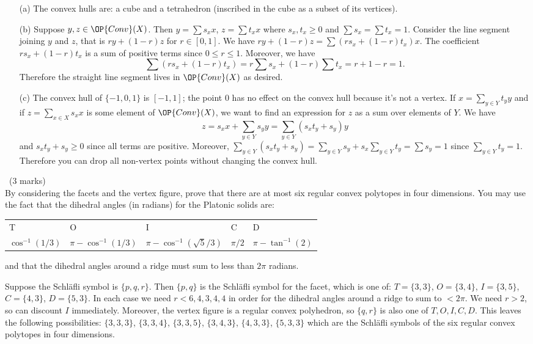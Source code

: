 \documentclass[12pt]{article}
\begin{document}
\begin{answer}
  \begin{enumerate}
  \item[(a)] The convex hulls are: a cube and a tetrahedron (inscribed in the cube as a subset of its vertices).
  \item[(b)] Suppose $y,z\in\OP{Conv}(X)$. Then $y=\sum s_xx$, $z=\sum t_xx$ where $s_x,t_x\geq 0$ and $\sum s_x=\sum t_x=1$. Consider the line segment joining $y$ and $z$, that is $ry+(1-r)z$ for $r\in[0,1]$. We have $ry+(1-r)z=\sum(rs_x+(1-r)t_x)x$. The coefficient $rs_x+(1-r)t_x$ is a sum of positive terms since $0\leq r\leq 1$. Moreover, we have
    \[\sum (rs_x+(1-r)t_x)=r\sum s_x+(1-r)\sum t_x=r+1-r=1.\]
    Therefore the straight line segment lives in $\OP{Conv}(X)$ as desired.
  \item[(c)] The convex hull of $\{-1,0,1\}$ is $[-1,1]$; the point 0 has no effect on the convex hull because it's not a vertex. If $x=\sum_{y\in Y} t_yy$ and if $z=\sum_{x\in X} s_xx$ is some element of $\OP{Conv}(X)$, we want to find an expression for $z$ as a sum over elements of $Y$. We have
    \[z=s_xx+\sum_{y\in Y}s_yy=\sum_{y\in Y}(s_xt_y+s_y)y\]
    and $s_xt_y+s_y\geq 0$ since all terms are positive. Moreover, $\sum_{y\in Y}(s_xt_y+s_y)=\sum_{y\in Y}s_y+s_x\sum_{y\in Y}t_y=\sum s_y=1$ since $\sum_{y\in Y}t_y=1$. Therefore you can drop all non-vertex points without changing the convex hull.
  \end{enumerate}
\end{answer}
\newpage

\vspace{1cm}

\begin{question}\ (3 marks)\\
  By considering the facets and the vertex figure, prove that there are at most six regular convex polytopes in four dimensions. You may use the fact that the dihedral angles (in radians) for the Platonic solids are:

  \begin{tabular}{p{3cm}|p{3cm}|p{3cm}|p{3cm}|p{3cm}}
    T & O & I & C & D\\
    $\cos^{-1}(1/3)$  & $\pi-\cos^{-1}(1/3)$  & $\pi-\cos^{-1}(\sqrt{5}/3)$  & $\pi/2$  & $\pi-\tan^{-1}(2)$
  \end{tabular}
  
  and that the dihedral angles around a ridge must sum to less than $2\pi$ radians.
\end{question}

\begin{answer}
Suppose the Schl\"afli symbol is $\{p,q,r\}$. Then $\{p,q\}$ is the Schl\"afli symbol for the facet, which is one of: $T=\{3,3\}$, $O=\{3,4\}$, $I=\{3,5\}$, $C=\{4,3\}$, $D=\{5,3\}$. In each case we need $r<6,4,3,4,4$ in order for the dihedral angles around a ridge to sum to $<2\pi$. We need $r>2$, so can discount $I$ immediately. Moreover, the vertex figure is a regular convex polyhedron, so $\{q,r\}$ is also one of $T,O,I,C,D$. This leaves the following possibilities: $\{3,3,3\}$, $\{3,3,4\}$, $\{3,3,5\}$, $\{3,4,3\}$, $\{4,3,3\}$, $\{5,3,3\}$ which are the Schl\"afli symbols of the six regular convex polytopes in four dimensions.
\end{answer}
\newpage
\end{document}
